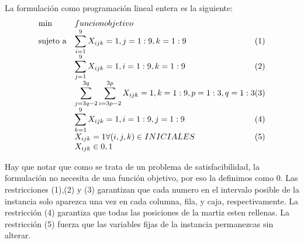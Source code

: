    
  La formulación como programación lineal entera es la siguiente:	
\begin{equation*}
\begin{array}{ll@{}ll}
\text{min}  & \displaystyle funcion objetivo &\\
\text{sujeto a} & \displaystyle\sum\limits_{i=1}^{9} X_{ijk}=1, j=1:9,k=1:9 & (1)\\
		& \displaystyle\sum\limits_{j=1}^{9} X_{ijk}=1,i=1:9,k=1:9 & (2)\\
		& \displaystyle\sum\limits_{j=3q-2}^{3q} \sum\limits_{i=3p-2}^{3p} X_{ijk}=1, k=1:9,p=1:3,q=1:3 & (3) \\
                 & \displaystyle\sum\limits_{k=1}^{9} X_{ijk}=1, i=1:9,j=1:9 & (4)\\
                 & X_{ijk}=1 \forall (i,j,k) \in INICIALES &(5) \\
                 &  X_{ijk} \in {0,1}
\end{array}
\end{equation*}

 
 Hay que notar que como se trata de un problema de satisfacibilidad, la formulación no necesita de una función objetivo, por eso la definimos como 0. Las restricciones (1),(2) y (3) garantizan que cada numero en el intervalo posible de la instancia solo aparezca una vez en cada columna, fila, y caja, respectivamente. La restricción (4) garantiza que todas las posiciones de la martiz esten rellenas. La restricción (5) fuerza que las variables fijas de la instancia permanezcas sin alterar.
